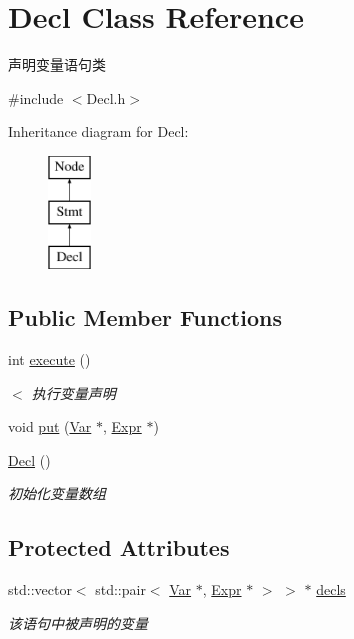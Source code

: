\hypertarget{class_decl}{}\section{Decl Class Reference}
\label{class_decl}


声明变量语句类  




{\ttfamily \#include $<$Decl.\+h$>$}

Inheritance diagram for Decl\+:\begin{figure}[H]
\begin{center}
\leavevmode
\includegraphics[height=3.000000cm]{class_decl}
\end{center}
\end{figure}
\subsection*{Public Member Functions}
\begin{DoxyCompactItemize}
\item 
\mbox{\label{class_decl_ad6495a4245a45dcdcd05e239c8db4a8b}} 
int \hyperlink{class_decl_ad6495a4245a45dcdcd05e239c8db4a8b}{execute} ()
\begin{DoxyCompactList}\small\item\em $<$ 执行变量声明 \end{DoxyCompactList}\item 
void \hyperlink{class_decl_a4c91db9c289b90f3045783f6bf53a688}{put} (\hyperlink{class_var}{Var} $\ast$, \hyperlink{class_expr}{Expr} $\ast$)
\item 
\mbox{\label{class_decl_a356b82bee7d66a98c8fbb3547836b785}} 
\hyperlink{class_decl_a356b82bee7d66a98c8fbb3547836b785}{Decl} ()
\begin{DoxyCompactList}\small\item\em 初始化变量数组 \end{DoxyCompactList}\end{DoxyCompactItemize}
\subsection*{Protected Attributes}
\begin{DoxyCompactItemize}
\item 
\mbox{\label{class_decl_a7e84697f4d13126d1234a49b68af7eeb}} 
std\+::vector$<$ std\+::pair$<$ \hyperlink{class_var}{Var} $\ast$, \hyperlink{class_expr}{Expr} $\ast$ $>$ $>$ $\ast$ \hyperlink{class_decl_a7e84697f4d13126d1234a49b68af7eeb}{decls}
\begin{DoxyCompactList}\small\item\em 该语句中被声明的变量 \end{DoxyCompactList}\end{DoxyCompactItemize}
